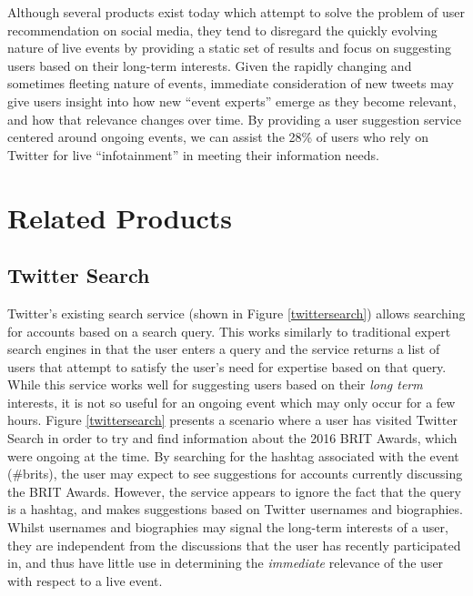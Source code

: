 \documentclass{l4proj}
\begin{document}
Although several products exist today which attempt to solve the problem of user recommendation on social media, they tend to disregard the quickly evolving nature of live events by providing a static set of results and focus on suggesting users based on their long-term interests. Given the rapidly changing and sometimes fleeting nature of events, immediate consideration of new tweets may give users insight into how new ``event experts'' emerge as they become relevant, and how that relevance changes over time. By providing a user suggestion service centered around ongoing events, we can assist the 28\% of users who rely on Twitter for live ``infotainment'' in meeting their information needs.


\section{Related Products}

\subsection{Twitter Search}
Twitter's existing search service (shown in Figure \ref{twittersearch}) allows searching for accounts based on a search query. This works similarly to traditional expert search engines in that the user enters a query and the service returns a list of users that attempt to satisfy the user's need for expertise based on that query. While this service works well for suggesting users based on their \textit{long term} interests, it is not so useful for an ongoing event which may only occur for a few hours. Figure \ref{twittersearch} presents a scenario where a user has visited Twitter Search in order to try and find information about the 2016 BRIT Awards, which were ongoing at the time. By searching for the hashtag associated with the event (\#brits), the user may expect to see suggestions for accounts currently discussing the BRIT Awards. However, the service appears to ignore the fact that the query is a hashtag, and makes suggestions based on Twitter usernames and biographies. Whilst usernames and biographies may signal the long-term interests of a user, they are independent from the discussions that the user has recently participated in, and thus have little use in determining the \textit{immediate} relevance of the user with respect to a live event.
\end{document}
